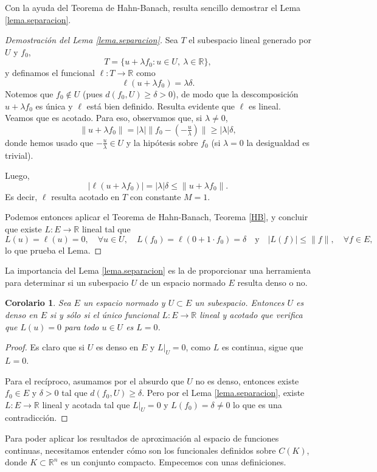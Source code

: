 \documentclass[12pt, a4paper]{amsbook}
\newcommand{\R}{{\mathbb R}}
\newtheorem{cor}[teo]{Corolario}
\theoremstyle{remark}
\theoremstyle{definition}
\numberwithin{section}{chapter}
\numberwithin{subsection}{section}
\numberwithin{equation}{section}
\numberwithin{figure}{chapter}
\begin{document}
Con la ayuda del Teorema de Hahn-Banach, resulta sencillo demostrar el Lema \ref{lema.separacion}.
\begin{proof}[Demostración del Lema \ref{lema.separacion}]
Sea $T$ el subespacio lineal generado por $U$ y $f_0$, 
$$
T = \{ u+\lambda f_0\colon u\in U,\ \lambda\in \R\},
$$
y definamos el funcional $\ell\colon T\to\R$ como
$$
\ell(u+\lambda f_0) = \lambda\delta.
$$
Notemos que $f_0\notin U$ (pues $d(f_0,U)\ge\delta>0$), de modo que la descomposición $u+\lambda f_0$ es única y $\ell$ está bien definido. Resulta evidente que $\ell$ es lineal. Veamos que es acotado. Para eso, observamos que, si $\lambda\ne0$,
$$
\|u+\lambda f_0\| = |\lambda| \|f_0 - \left(-\tfrac{u}{\lambda}\right)\| \ge |\lambda| \delta,
$$
donde hemos usado que $-\tfrac{u}{\lambda}\in U$ y la hipótesis sobre $f_0$ (si $\lambda=0$ la desigualdad es trivial).

Luego,
$$
|\ell(u+\lambda f_0)| = |\lambda|\delta \le \|u+\lambda f_0\|.
$$
Es decir, $\ell$ resulta acotado en $T$ con constante $M=1$.

Podemos entonces aplicar el Teorema de Hahn-Banach, Teorema \ref{HB}, y concluir que existe $L\colon E\to\R$ lineal tal que
$$
L(u) = \ell(u) = 0,\quad \forall u\in U,\quad L(f_0) = \ell(0+1\cdot f_0) = \delta \quad \text{y}\quad |L(f)|\le \|f\|,\quad \forall f\in E,
$$
lo que prueba el Lema.
\end{proof}

La importancia del Lema \ref{lema.separacion} es la de proporcionar una herramienta para determinar si un subespacio $U$ de un espacio normado $E$ resulta denso o no.
\begin{cor}\label{cor.U.dense.normado}
Sea $E$ un espacio normado y $U\subset E$ un subespacio. Entonces $U$ es denso en $E$ si y sólo si el único funcional $L\colon E\to\R$ lineal y acotado que verifica que $L(u)=0$ para todo $u\in U$ es $L=0$. 
\end{cor}

\begin{proof}
Es claro que si $U$ es denso en $E$ y $L|_U=0$, como $L$ es continua, sigue que $L=0$.

Para el recíproco, asumamos por el absurdo que $U$ no es denso, entonces existe $f_0\in E$ y $\delta>0$ tal que $d(f_0, U)\ge \delta$. Pero por el Lema \ref{lema.separacion}, existe $L\colon E\to\R$ lineal y acotada tal que $L|_U=0$ y $L(f_0)=\delta\neq 0$ lo que es una contradicción.
\end{proof}


Para poder aplicar los resultados de aproximación al espacio de funciones continuas, necesitamos entender cómo son los funcionales definidos sobre $C(K)$, donde $K\subset \R^n$ es un conjunto compacto. Empecemos con unas definiciones.
\end{document}
